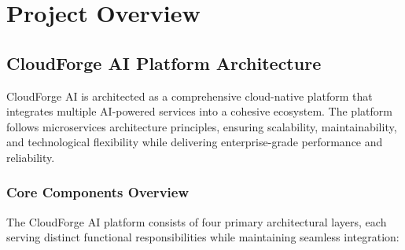 \chapter{Project Overview}

\section{CloudForge AI Platform Architecture}

CloudForge AI is architected as a comprehensive cloud-native platform that integrates multiple AI-powered services into a cohesive ecosystem. The platform follows microservices architecture principles, ensuring scalability, maintainability, and technological flexibility while delivering enterprise-grade performance and reliability.

\subsection{Core Components Overview}

The CloudForge AI platform consists of four primary architectural layers, each serving distinct functional responsibilities while maintaining seamless integration:

